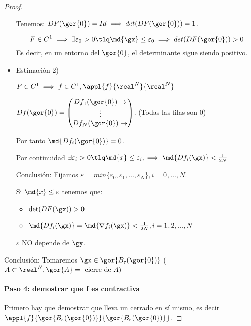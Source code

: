 \documentclass{apuntes}
\begin{document}
\begin{proof}
\begin{itemize}
  Tenemos: $DF(\gor{0}) = Id \implies det(DF(\gor{0})) = 1$. 
  
  $$F\in C^1 \implies \exists \varepsilon_0 >0 \tlq \md{\gx} \leq \varepsilon_0 \implies  det(DF(\gor{0}))>0$$
  Es decir, en un entorno del $\gor{0}$, el determinante sigue siendo positivo.
  
  \item Estimación 2)
  
  $F\in C^1 \implies f \in C^1, \appl{f}{\real^N}{\real^N}$
  
  $Df(\gor{0}) = \begin{pmatrix}
                  Df_1(\gor{0}) \rightarrow\\
                  \vdots\\
                  Df_N(\gor{0}) \rightarrow
                 \end{pmatrix}$. (Todas las filas son 0)
                 
 Por tanto $\md{Df_i(\gor{0})} = 0$.
 
 Por continuidad $\exists \varepsilon_i > 0 \tlq \md{x} \leq \varepsilon_i, \implies \md{Df_i(\gx)} <\frac{1}{2N}$
 
 Conclusión: Fijamos $\varepsilon = min \{\varepsilon_0,\varepsilon_1,\dotsc, \varepsilon_N\} ,i=0,\dotsc,N$.
 
 Si $\md{x} \leq \varepsilon$ tenemos que: \begin{itemize}
                                             \item $\det(DF(\gx))>0$
                                             \item $\md{Df_i(\gx)}  = \md{\nabla f_i(\gx)} < \frac{1}{2N}, i=1,2,...,N$
                                            \end{itemize}
                                            
 \obs $\varepsilon$ NO depende de $\gy$.

 
 \end{itemize}
  Conclusión: Tomaremos $\gx\in \gor{B_\varepsilon(\gor{0})}$ ($A\subset\real^N, \gor{A} = \text{ cierre de } A)$
  
  \paragraph{Paso 4: demostrar que f es contractiva }
  
  Primero hay que demostrar que lleva un cerrado en sí mismo, es decir $\appl{f}{ \gor{B_\varepsilon(\gor{0})}}{ \gor{B_\varepsilon(\gor{0})}}$.
  

\end{proof}
\end{document}
